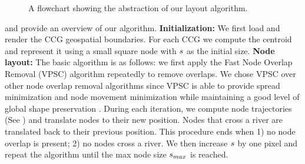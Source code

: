 {\begin{figure}[b!]
    \caption{A flowchart showing the abstraction of our layout algorithm.}
    \label{fig:flowchart}
\end{figure}
}

 and  provide an overview of our algorithm. \textbf{Initialization:} We first load and render the CCG geospatial boundaries. For each CCG we compute the centroid and represent it using a small square node with $ s $ as the initial size. \textbf{Node layout:} The basic algorithm is as follows: we first apply the Fast Node Overlap Removal (VPSC) algorithm \cite{dwyer2006fast} repeatedly to remove overlaps. We chose VPSC over other node overlap removal algorithms since VPSC is able to provide spread minimization and node movement minimization while maintaining a good level of global shape preservation \cite{chen2020Node}. During each iteration, we compute node trajectories (See ) and translate nodes to their new position. Nodes that cross a river are translated back to their previous position. This procedure ends when 1) no node overlap is present; 2) no nodes cross a river. We then increase $ s $ by one pixel and repeat the algorithm until the max node size $ s_{max} $ is reached. 


